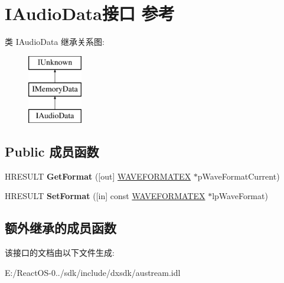 \hypertarget{interface_i_audio_data}{}\section{I\+Audio\+Data接口 参考}
\label{interface_i_audio_data}
类 I\+Audio\+Data 继承关系图\+:\begin{figure}[H]
\begin{center}
\leavevmode
\includegraphics[height=3.000000cm]{interface_i_audio_data}
\end{center}
\end{figure}
\subsection*{Public 成员函数}
\begin{DoxyCompactItemize}
\item 
\mbox{\label{interface_i_audio_data_a4f7d425997802fc049e04938d73a5c24}} 
H\+R\+E\+S\+U\+LT {\bfseries Get\+Format} (\mbox{[}out\mbox{]} \hyperlink{struct_w_a_v_e_f_o_r_m_a_t_e_x}{W\+A\+V\+E\+F\+O\+R\+M\+A\+T\+EX} $\ast$p\+Wave\+Format\+Current)
\item 
\mbox{\label{interface_i_audio_data_a9710d7a69670f69dcb5df498b2f9fc57}} 
H\+R\+E\+S\+U\+LT {\bfseries Set\+Format} (\mbox{[}in\mbox{]} const \hyperlink{struct_w_a_v_e_f_o_r_m_a_t_e_x}{W\+A\+V\+E\+F\+O\+R\+M\+A\+T\+EX} $\ast$lp\+Wave\+Format)
\end{DoxyCompactItemize}
\subsection*{额外继承的成员函数}


该接口的文档由以下文件生成\+:\begin{DoxyCompactItemize}
\item 
E\+:/\+React\+O\+S-\/0../sdk/include/dxsdk/austream.\+idl\end{DoxyCompactItemize}
